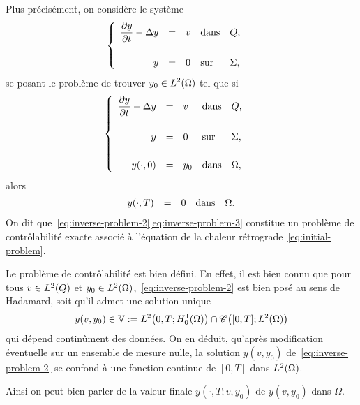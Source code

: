 Plus précisément, on considère le système
\begin{equation*}\label{eq:inverse-problem-1}
    \begin{cases}\displaystyle
        \begin{array}{rclll}
            \dfrac{\partial{}y}{\partial{}t} - \Delta y & = & v & \text{dans} & Q,\\
            \\
            y & = & 0 & \text{sur} & \Sigma,
        \end{array}
    \end{cases}
\end{equation*}
se posant le problème de trouver $\displaystyle y_{0}\in L^{2}\!\left({\Omega}\right)$ tel
que si
\begin{equation}\label{eq:inverse-problem-2}
    \begin{cases}\displaystyle
        \begin{array}{rclll}
            \dfrac{\partial{}y}{\partial{}t} - \Delta y & = & v & \text{dans} & Q,\\
            \\
            y & = & 0 & \text{sur} & \Sigma,\\
            \\
            {y}\!\left({\cdot, 0}\right) & = & y_{0} & \text{dans} & \Omega,
        \end{array}
    \end{cases}
\end{equation}
alors
\begin{equation}\label{eq:inverse-problem-3}
    \begin{array}{rclll}
        {y}\!\left({\cdot,T}\right) & = & 0 & \text{dans} & \Omega.
    \end{array}
\end{equation}
On dit que~\eqref{eq:inverse-problem-2}\eqref{eq:inverse-problem-3}
constitue un problème de contrôlabilité exacte associé à l'équation de la
chaleur rétrograde~\eqref{eq:initial-problem}.

\begin{remarque}%
    Le problème de contrôlabilité est bien défini. En effet, il est bien
    connu que pour tous $v\in L^{2}\!\left({Q}\right)$ et
    $y_{0}\in L^{2}\!\left({\Omega}\right)$,~\eqref{eq:inverse-problem-2} est bien posé au
    sens de Hadamard, soit qu'il admet une solution unique
    \begin{equation*}\label{eq:well-posedness-heat-equation}
        y\!\left({v,y_{0}}\right)\in \mathbb{V} := L^{2}\!\left({0,T;
        H_{0}^{1}(\Omega)}\right)\cap \mathscr{C}\!\left({[0,T];L^{2}\!\left({\Omega}\right)}\right)
    \end{equation*}
    qui dépend continûment des données. On en déduit, qu'après modification
    éventuelle sur un ensemble de mesure nulle, la solution
    $y\!\left({v,y_{0}}\right)$ de~\eqref{eq:inverse-problem-2}
    se confond à une fonction continue de $[0,T]$ dans $L^{2}\!\left({\Omega}\right)$.

    Ainsi on peut bien parler de la valeur finale
    $y\!\left({\cdot,T;v,y_{0}}\right)$ de
    $y\!\left({v,y_{0}}\right)$ dans $\Omega$.
\end{remarque}

